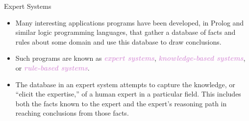 \documentclass[xcolor=dvipsnames,9pt,handout,show notes]{beamer}
\theoremstyle{definition}
\theoremstyle{remark}
\numberwithin{theorem}{section}
\numberwithin{claim}{section}
\numberwithin{equation}{section}
\numberwithin{conjecture}{section}
\newcommand{\defn}[1]{\textcolor{Plum}{\textit{\textbf{#1}}}}
\begin{document}
\begin{frame}{Expert Systems}
  \begin{itemize}
  \item
Many interesting applications programs have been developed, in Prolog and
similar logic programming languages, that gather a database of facts and rules
about some domain and use this database to draw conclusions. 
\item<2->Such programs are known as \defn{expert systems}, \defn{knowledge-based
    systems}, or \defn{rule-based systems}. 
\item<3->  The database in an expert system attempts to capture the knowledge, or ``elicit
  the expertise,'' of a human expert in a particular field. 
This includes both the facts known to the expert and the expert's reasoning path
in reaching conclusions from those facts. 
  \end{itemize}
\end{frame}
\end{document}
